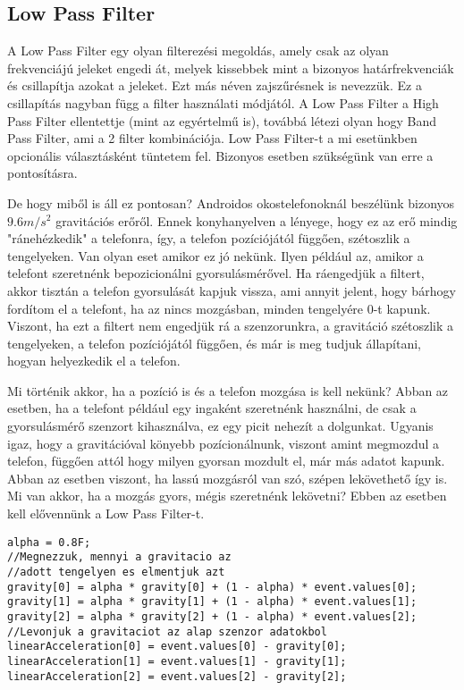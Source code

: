 \documentclass{thesis-ekf}
\theoremstyle{definition}
\theoremstyle{remark}
\begin{document}
\subsection{Low Pass Filter}
A Low Pass Filter egy olyan filterezési megoldás, amely csak az olyan frekvenciájú jeleket engedi át, melyek kissebbek mint a bizonyos határfrekvenciák és csillapítja azokat a jeleket. Ezt más néven zajszűrésnek is nevezzük. Ez a csillapítás nagyban függ a filter használati módjától. A Low Pass Filter a High Pass Filter ellentettje (mint az egyértelmű is), továbbá létezi olyan hogy Band Pass Filter, ami a 2 filter kombinációja. Low Pass Filter-t a mi esetünkben opcionális választásként tüntetem fel. Bizonyos esetben szükségünk van erre a pontosításra.
\par De hogy miből is áll ez pontosan? Androidos okostelefonoknál beszélünk bizonyos $9.6 m/s^2$ gravitációs erőről. Ennek konyhanyelven a lényege, hogy ez az erő mindig "ránehézkedik" a telefonra, így, a telefon pozíciójától függően, szétoszlik a tengelyeken. Van olyan eset amikor ez jó nekünk. Ilyen például az, amikor a telefont szeretnénk bepozicionálni gyorsulásmérővel. Ha ráengedjük a filtert, akkor tisztán a telefon gyorsulását kapjuk vissza, ami annyit jelent, hogy bárhogy fordítom el a telefont, ha az nincs mozgásban, minden tengelyére 0-t kapunk. Viszont, ha ezt a filtert nem engedjük rá a szenzorunkra, a gravitáció szétoszlik a tengelyeken, a telefon pozíciójától függően, és már is meg tudjuk állapítani, hogyan helyezkedik el a telefon.
\par Mi történik akkor, ha a pozíció is és a telefon mozgása is kell nekünk? Abban az esetben, ha a telefont például egy ingaként szeretnénk használni, de csak a gyorsulásmérő szenzort kihasználva, ez egy picit nehezít a dolgunkat. Ugyanis igaz, hogy a gravitációval könyebb pozícionálnunk, viszont amint megmozdul a telefon, függően attól hogy milyen gyorsan mozdult el, már más adatot kapunk. Abban az esetben viszont, ha lassú mozgásról van szó, szépen lekövethető így is. Mi van akkor, ha a mozgás gyors, mégis szeretnénk lekövetni? Ebben az esetben kell elővennünk a Low Pass Filter-t.
\begin{lstlisting}
alpha = 0.8F;
//Megnezzuk, mennyi a gravitacio az
//adott tengelyen es elmentjuk azt
gravity[0] = alpha * gravity[0] + (1 - alpha) * event.values[0];
gravity[1] = alpha * gravity[1] + (1 - alpha) * event.values[1];
gravity[2] = alpha * gravity[2] + (1 - alpha) * event.values[2];
//Levonjuk a gravitaciot az alap szenzor adatokbol
linearAcceleration[0] = event.values[0] - gravity[0];
linearAcceleration[1] = event.values[1] - gravity[1];
linearAcceleration[2] = event.values[2] - gravity[2];
\end{lstlisting}
\end{document}

